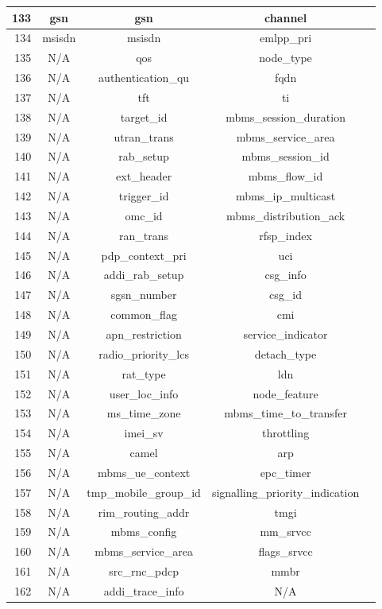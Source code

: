 \documentclass[english]{report}
\begin{document}
\begin{itemize}
\begin{longtable}{|r|c|c|c|p{13.5cm}|}
\hline
133 & gsn & gsn & channel\\
\hline
134 & msisdn & msisdn & emlpp\_pri\\
\hline
135 & N/A & qos & node\_type\\
\hline
136 & N/A & authentication\_qu & fqdn\\
\hline
137 & N/A & tft & ti\\
\hline
138 & N/A & target\_id & mbms\_session\_duration\\
\hline
139 & N/A & utran\_trans & mbms\_service\_area\\
\hline
140 & N/A & rab\_setup & mbms\_session\_id\\
\hline
141 & N/A & ext\_header & mbms\_flow\_id\\
\hline
142 & N/A & trigger\_id & mbms\_ip\_multicast\\
\hline
143 & N/A & omc\_id & mbms\_distribution\_ack\\
\hline
144 & N/A & ran\_trans & rfsp\_index\\
\hline
145 & N/A & pdp\_context\_pri & uci\\
\hline
146 & N/A & addi\_rab\_setup & csg\_info\\
\hline
147 & N/A & sgsn\_number & csg\_id\\
\hline
148 & N/A & common\_flag & cmi\\
\hline
149 & N/A & apn\_restriction & service\_indicator\\
\hline
150 & N/A & radio\_priority\_lcs & detach\_type\\
\hline
151 & N/A & rat\_type & ldn\\
\hline
152 & N/A & user\_loc\_info & node\_feature\\
\hline
153 & N/A & ms\_time\_zone & mbms\_time\_to\_transfer\\
\hline
154 & N/A & imei\_sv & throttling\\
\hline
155 & N/A & camel & arp\\
\hline
156 & N/A & mbms\_ue\_context & epc\_timer\\
\hline
157 & N/A & tmp\_mobile\_group\_id & signalling\_priority\_indication\\
\hline
158 & N/A & rim\_routing\_addr & tmgi\\
\hline
159 & N/A & mbms\_config & mm\_srvcc\\
\hline
160 & N/A & mbms\_service\_area & flags\_srvcc\\
\hline
161 & N/A & src\_rnc\_pdcp & mmbr\\
\hline
162 & N/A & addi\_trace\_info & N/A\\

\end{longtable}
\end{itemize}
\end{document}
